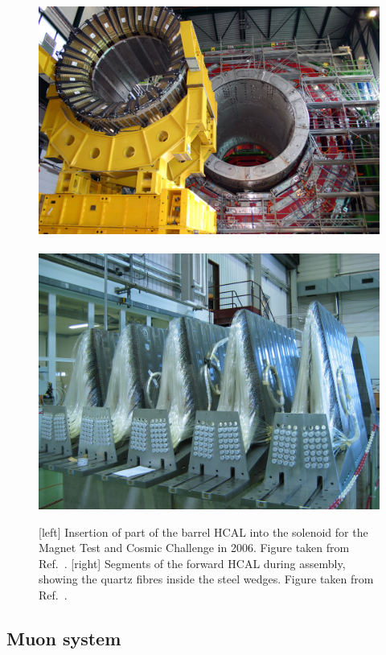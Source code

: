 \begin{figure}[htpb]
  \centering
  \includegraphics[height=0.2\textheight]{figures/cms/cms_hcal}
~
  \includegraphics[height=0.2\textheight]{figures/cms/cms_hf_cds1431489}
  \caption{[left] Insertion of part of the barrel HCAL into the solenoid for the Magnet Test
and Cosmic Challenge in 2006. Figure taken from Ref.~\cite{CMS_hcal}.
[right] Segments of the forward HCAL during assembly, showing the quartz fibres inside the steel
wedges. Figure taken from Ref.~\cite{CMS_hf}. 
  \label{fig:cms_hcal}}
\end{figure}

\subsection{Muon system \label{sec:cms_muon_system}}

